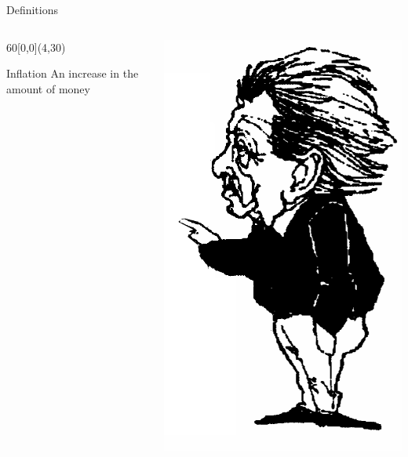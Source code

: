 \begin{frame}{Definitions}
    \begin{columns}[onlytextwidth]
        \begin{textblock}{60}[0,0](4,30)
            \begin{varblock}[0.9\textwidth]{Inflation}%
                An increase in the amount of money
            \end{varblock}
        \end{textblock}

            \centering
            \includegraphics[height=0.75\textheight]{img/einstein.png} \\

    \end{columns}
\end{frame}

